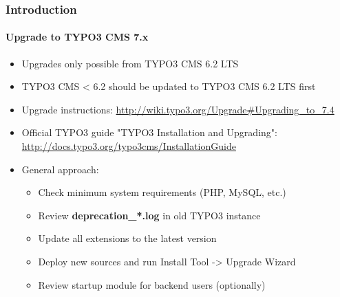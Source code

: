 \begin{frame}[fragile]
	\frametitle{Introduction}
	\framesubtitle{Upgrade to TYPO3 CMS 7.x}

	\begin{itemize}
		\item Upgrades only possible from TYPO3 CMS 6.2 LTS
		\item TYPO3 CMS < 6.2 should be updated to TYPO3 CMS 6.2 LTS first
	\end{itemize}

	\begin{itemize}

		\item Upgrade instructions:\newline
			\smaller\url{http://wiki.typo3.org/Upgrade#Upgrading_to_7.4}\normalsize
		\item Official TYPO3 guide "TYPO3 Installation and Upgrading":
			\smaller\url{http://docs.typo3.org/typo3cms/InstallationGuide}\normalsize
		\item General approach:
			\begin{itemize}
				\item Check minimum system requirements \small(PHP, MySQL, etc.)
				\item Review \textbf{deprecation\_*.log} in old TYPO3 instance
				\item Update all extensions to the latest version
				\item Deploy new sources and run Install Tool -> Upgrade Wizard
				\item Review startup module for backend users (optionally)
			\end{itemize}
	\end{itemize}

\end{frame}

